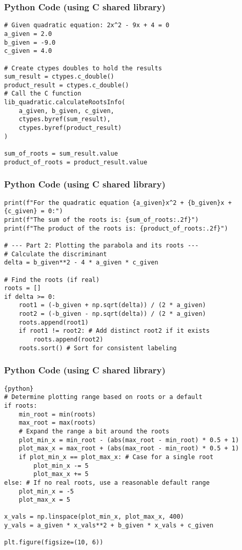 \documentclass{beamer}
\begin{document}
\begin{frame}[fragile]
\frametitle{Python Code (using C shared library)}
\begin{lstlisting}
# Given quadratic equation: 2x^2 - 9x + 4 = 0
a_given = 2.0
b_given = -9.0
c_given = 4.0

# Create ctypes doubles to hold the results
sum_result = ctypes.c_double()
product_result = ctypes.c_double()
# Call the C function
lib_quadratic.calculateRootsInfo(
    a_given, b_given, c_given,
    ctypes.byref(sum_result),
    ctypes.byref(product_result)
)

sum_of_roots = sum_result.value
product_of_roots = product_result.value
\end{lstlisting}
\end{frame}

\begin{frame}[fragile]
\frametitle{Python Code (using C shared library)}
\begin{lstlisting}
print(f"For the quadratic equation {a_given}x^2 + {b_given}x + {c_given} = 0:")
print(f"The sum of the roots is: {sum_of_roots:.2f}")
print(f"The product of the roots is: {product_of_roots:.2f}")

# --- Part 2: Plotting the parabola and its roots ---
# Calculate the discriminant
delta = b_given**2 - 4 * a_given * c_given

# Find the roots (if real)
roots = []
if delta >= 0:
    root1 = (-b_given + np.sqrt(delta)) / (2 * a_given)
    root2 = (-b_given - np.sqrt(delta)) / (2 * a_given)
    roots.append(root1)
    if root1 != root2: # Add distinct root2 if it exists
        roots.append(root2)
    roots.sort() # Sort for consistent labeling
\end{lstlisting}
\end{frame}

\begin{frame}[fragile]
\frametitle{Python Code (using C shared library)}
\begin{lstlisting}{python}
# Determine plotting range based on roots or a default
if roots:
    min_root = min(roots)
    max_root = max(roots)
    # Expand the range a bit around the roots
    plot_min_x = min_root - (abs(max_root - min_root) * 0.5 + 1)
    plot_max_x = max_root + (abs(max_root - min_root) * 0.5 + 1)
    if plot_min_x == plot_max_x: # Case for a single root
        plot_min_x -= 5
        plot_max_x += 5
else: # If no real roots, use a reasonable default range
    plot_min_x = -5
    plot_max_x = 5

x_vals = np.linspace(plot_min_x, plot_max_x, 400)
y_vals = a_given * x_vals**2 + b_given * x_vals + c_given

plt.figure(figsize=(10, 6))
\end{lstlisting}
\end{frame}
\end{document}
